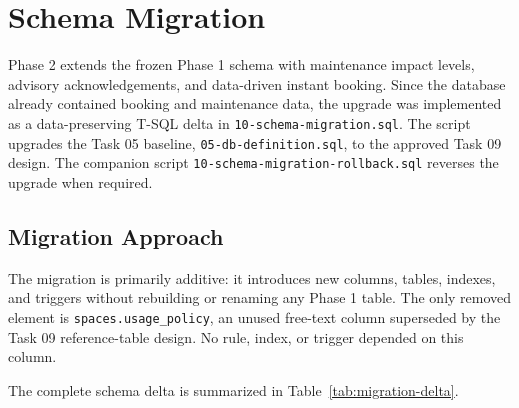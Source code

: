 \section{Schema Migration}
\label{sec:schema-migration}

Phase 2 extends the frozen Phase 1 schema with maintenance impact levels,
advisory acknowledgements, and data-driven instant booking. Since the database
already contained booking and maintenance data, the upgrade was implemented as
a data-preserving T-SQL delta in \texttt{10-schema-migration.sql}. The script
upgrades the Task 05 baseline, \texttt{05-db-definition.sql}, to the approved
Task 09 design. The companion script
\texttt{10-schema-migration-rollback.sql} reverses the upgrade when required.

\subsection{Migration Approach}

The migration is primarily additive: it introduces new columns, tables,
indexes, and triggers without rebuilding or renaming any Phase 1 table. The
only removed element is \texttt{spaces.usage\_policy}, an unused free-text
column superseded by the Task 09 reference-table design. No rule, index, or
trigger depended on this column.

The complete schema delta is summarized in Table~\ref{tab:migration-delta}.

